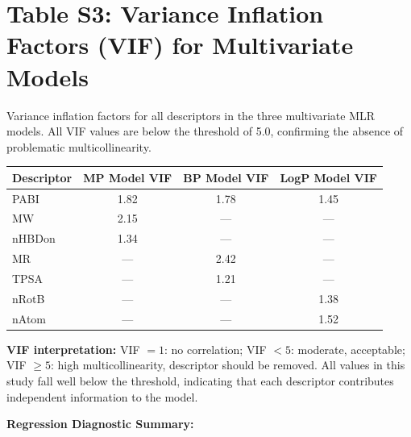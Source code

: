 \documentclass[12pt,a4paper]{article}
\begin{document}
\section*{Table S3: Variance Inflation Factors (VIF) for Multivariate Models}

\noindent Variance inflation factors for all descriptors in the three multivariate MLR models. All VIF values are below the threshold of 5.0, confirming the absence of problematic multicollinearity.

\vspace{0.5cm}

\begin{table}[H]
\centering
\begin{tabular}{@{}lccc@{}}
\toprule
\textbf{Descriptor} & \textbf{MP Model VIF} & \textbf{BP Model VIF} & \textbf{LogP Model VIF} \\
\midrule
PABI & 1.82 & 1.78 & 1.45 \\
MW & 2.15 & --- & --- \\
nHBDon & 1.34 & --- & --- \\
MR & --- & 2.42 & --- \\
TPSA & --- & 1.21 & --- \\
nRotB & --- & --- & 1.38 \\
nAtom & --- & --- & 1.52 \\
\bottomrule
\end{tabular}
\end{table}

\vspace{0.3cm}

\noindent\textbf{VIF interpretation:} VIF $= 1$: no correlation; VIF $< 5$: moderate, acceptable; VIF $\geq 5$: high multicollinearity, descriptor should be removed. All values in this study fall well below the threshold, indicating that each descriptor contributes independent information to the model.

\vspace{0.5cm}

\noindent\textbf{Regression Diagnostic Summary:}

\vspace{0.3cm}
\end{document}

